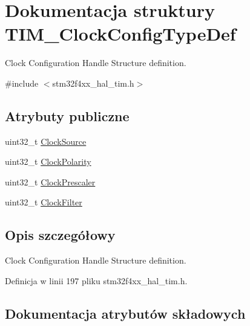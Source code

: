 \hypertarget{struct_t_i_m___clock_config_type_def}{}\section{Dokumentacja struktury T\+I\+M\+\_\+\+Clock\+Config\+Type\+Def}
\label{struct_t_i_m___clock_config_type_def}


Clock Configuration Handle Structure definition.  




{\ttfamily \#include $<$stm32f4xx\+\_\+hal\+\_\+tim.\+h$>$}

\subsection*{Atrybuty publiczne}
\begin{DoxyCompactItemize}
\item 
uint32\+\_\+t \hyperlink{struct_t_i_m___clock_config_type_def_a54c329013b5f6f87d1c3d2495fca84d2}{Clock\+Source}
\item 
uint32\+\_\+t \hyperlink{struct_t_i_m___clock_config_type_def_a66453fa8dc8a300267ff5aba08eff5c4}{Clock\+Polarity}
\item 
uint32\+\_\+t \hyperlink{struct_t_i_m___clock_config_type_def_ae4c0cb6f58da0ec7b99f1c6411d2fee1}{Clock\+Prescaler}
\item 
uint32\+\_\+t \hyperlink{struct_t_i_m___clock_config_type_def_adaf66568c766f75c4c661a872ca399e3}{Clock\+Filter}
\end{DoxyCompactItemize}


\subsection{Opis szczegółowy}
Clock Configuration Handle Structure definition. 

Definicja w linii 197 pliku stm32f4xx\+\_\+hal\+\_\+tim.\+h.



\subsection{Dokumentacja atrybutów składowych}
\mbox{\label{struct_t_i_m___clock_config_type_def_adaf66568c766f75c4c661a872ca399e3}} 
